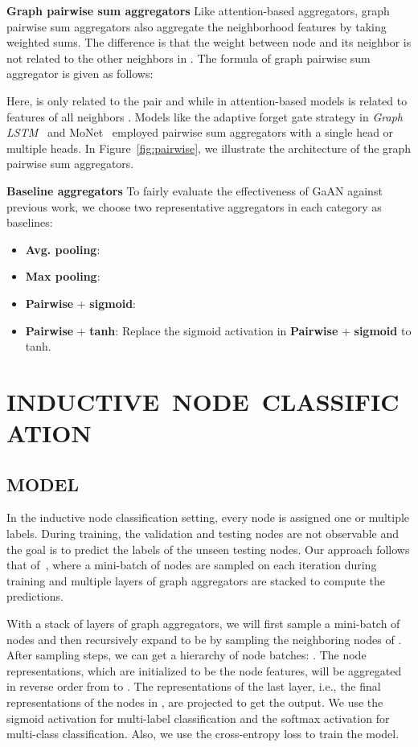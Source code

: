 \documentclass{article}
\begin{document}
	
	
\textbf{Graph pairwise sum aggregators}\quad
	Like attention-based aggregators, graph pairwise sum aggregators also aggregate the neighborhood features by taking  weighted sums. The difference is that the weight between node  and its neighbor  is not related to the other neighbors in . The formula of graph pairwise sum aggregator is given as follows:
	
Here,  is only related to the pair  and  while in attention-based models  is related to features of all neighbors . 
	Models like the adaptive forget gate strategy in \emph{Graph LSTM}~\citep{liang2016semantic} and MoNet~\citep{monti2017geometric} employed pairwise sum aggregators with a single head or multiple heads. In Figure~\ref{fig:pairwise},  we illustrate the architecture of the graph pairwise sum aggregators.
	
	\textbf{Baseline aggregators} \quad To fairly evaluate the effectiveness of GaAN against previous work, we choose two representative aggregators in each category as baselines:
	\begin{itemize}
\item \textbf{Avg. pooling}: 
		\item \textbf{Max pooling}: 
		\item \textbf{Pairwise} + \textbf{sigmoid}:
		
		\item \textbf{Pairwise} + \textbf{tanh}:  Replace the sigmoid activation in \textbf{Pairwise} + \textbf{sigmoid} to tanh.
	\end{itemize}
	
\section{INDUCTIVE~NODE~CLASSIFICATION}
	\subsection{MODEL}
	\label{sec:inductive_model}
	In the inductive node classification setting, every node is assigned one or multiple labels. During training, the validation and testing nodes are not observable and the goal is to predict the labels of the unseen testing nodes. Our approach follows that of~\citep{hamilton2017inductive}, where a mini-batch of nodes are sampled on each iteration during training and multiple layers of graph aggregators are stacked to compute the predictions.
	
	With a stack of  layers of graph aggregators, we will first sample a mini-batch of nodes  and then recursively expand  to be  by sampling the neighboring nodes of . After  sampling steps, we can get a hierarchy of node batches: . The node representations, which are initialized to be the node features, will be aggregated in reverse order from  to . The representations of the last layer, i.e., the final representations of the nodes in , are projected to get the output. We use the sigmoid activation for multi-label classification and the softmax activation for multi-class classification. Also, we use the cross-entropy loss to train the model.
	
\end{document}
